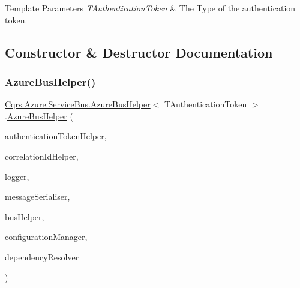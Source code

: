 \begin{DoxyTemplParams}{Template Parameters}
{\em T\+Authentication\+Token} & The Type of the authentication token.\\
\hline
\end{DoxyTemplParams}


\subsection{Constructor \& Destructor Documentation}
\mbox{\label{classCqrs_1_1Azure_1_1ServiceBus_1_1AzureBusHelper_af4ca8255d3eb87180c5e24996e1f6e15_af4ca8255d3eb87180c5e24996e1f6e15}} 
\subsubsection{\texorpdfstring{Azure\+Bus\+Helper()}{AzureBusHelper()}}
{\footnotesize\ttfamily \hyperlink{classCqrs_1_1Azure_1_1ServiceBus_1_1AzureBusHelper}{Cqrs.\+Azure.\+Service\+Bus.\+Azure\+Bus\+Helper}$<$ T\+Authentication\+Token $>$.\hyperlink{classCqrs_1_1Azure_1_1ServiceBus_1_1AzureBusHelper}{Azure\+Bus\+Helper} (\begin{DoxyParamCaption}\item[{\hyperlink{interfaceCqrs_1_1Authentication_1_1IAuthenticationTokenHelper}{I\+Authentication\+Token\+Helper}$<$ T\+Authentication\+Token $>$}]{authentication\+Token\+Helper,  }\item[{I\+Correlation\+Id\+Helper}]{correlation\+Id\+Helper,  }\item[{I\+Logger}]{logger,  }\item[{\hyperlink{interfaceCqrs_1_1Azure_1_1ServiceBus_1_1IMessageSerialiser}{I\+Message\+Serialiser}$<$ T\+Authentication\+Token $>$}]{message\+Serialiser,  }\item[{\hyperlink{interfaceCqrs_1_1Bus_1_1IBusHelper}{I\+Bus\+Helper}}]{bus\+Helper,  }\item[{\hyperlink{interfaceCqrs_1_1Configuration_1_1IConfigurationManager}{I\+Configuration\+Manager}}]{configuration\+Manager,  }\item[{\hyperlink{interfaceCqrs_1_1Configuration_1_1IDependencyResolver}{I\+Dependency\+Resolver}}]{dependency\+Resolver }\end{DoxyParamCaption})}



